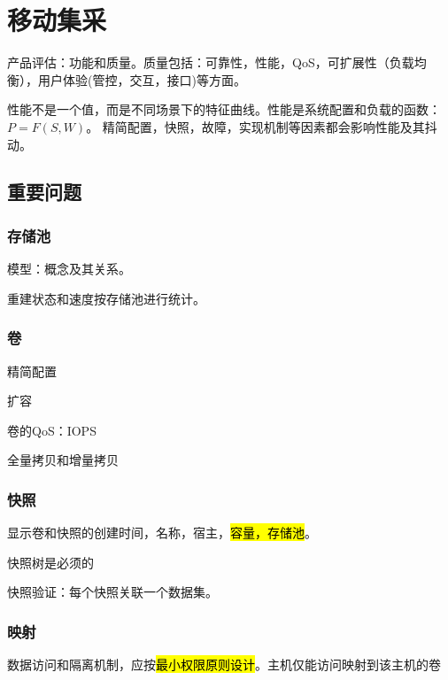 \chapter{移动集采}

产品评估：功能和质量。质量包括：可靠性，性能，QoS，可扩展性（负载均衡），用户体验(管控，交互，接口)等方面。

性能不是一个值，而是不同场景下的特征曲线。性能是系统配置和负载的函数：$P=F(S, W)$。
精简配置，快照，故障，实现机制等因素都会影响性能及其抖动。

\section{重要问题}

\subsection{存储池}

模型：概念及其关系。

重建状态和速度按存储池进行统计。

\subsection{卷}

\begin{enumbox}
    \item 精简配置
    \item 扩容
    \item 卷的QoS：IOPS
    \item 全量拷贝和增量拷贝
\end{enumbox}

\subsection{快照}

\begin{enumbox}
    \item 显示卷和快照的创建时间，名称，宿主，\hl{容量，存储池}。
    \item 快照树是必须的
    \item 快照验证：每个快照关联一个数据集。
\end{enumbox}

\subsection{映射}

数据访问和隔离机制，应按\hl{最小权限原则设计}。主机仅能访问映射到该主机的卷

